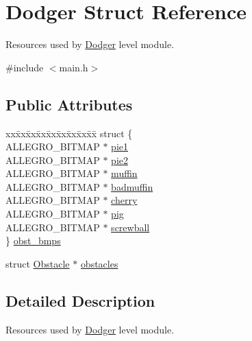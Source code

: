 \hypertarget{structDodger}{\section{Dodger Struct Reference}
\label{structDodger}
}


Resources used by \hyperlink{structDodger}{Dodger} level module.  




{\ttfamily \#include $<$main.\-h$>$}

\subsection*{Public Attributes}
\begin{DoxyCompactItemize}
\item 
\begin{tabbing}
xx\=xx\=xx\=xx\=xx\=xx\=xx\=xx\=xx\=\kill
struct \{\\
\>ALLEGRO\_BITMAP $\ast$ \hyperlink{structDodger_a4f7d7343cac6f73d52ad090f3a6a19c3}{pie1}\\
\>ALLEGRO\_BITMAP $\ast$ \hyperlink{structDodger_a10322a7b25a6622f22dbde738d58151c}{pie2}\\
\>ALLEGRO\_BITMAP $\ast$ \hyperlink{structDodger_a9848452f9b8886eaeb49824abd98cfa2}{muffin}\\
\>ALLEGRO\_BITMAP $\ast$ \hyperlink{structDodger_a10d42f3b0807e8d538e23d459de7cddc}{badmuffin}\\
\>ALLEGRO\_BITMAP $\ast$ \hyperlink{structDodger_a374d77e3c665e735db2c92f457d80273}{cherry}\\
\>ALLEGRO\_BITMAP $\ast$ \hyperlink{structDodger_a940e169cb64d0cd3d3a532e9b54ab4a0}{pig}\\
\>ALLEGRO\_BITMAP $\ast$ \hyperlink{structDodger_a703df249c4b1572717c221aa48588df3}{screwball}\\
\} \hyperlink{structDodger_abbf5585478c85e05e1c60258de290507}{obst\_bmps}\\

\end{tabbing}\item 
struct \hyperlink{structObstacle}{Obstacle} $\ast$ \hyperlink{structDodger_a114a5a2b5b3640ce2bd7b5a9f7486dfc}{obstacles}
\end{DoxyCompactItemize}


\subsection{Detailed Description}
Resources used by \hyperlink{structDodger}{Dodger} level module. 

